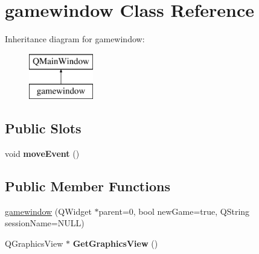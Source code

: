 \hypertarget{classgamewindow}{\section{gamewindow Class Reference}
\label{classgamewindow}
}
Inheritance diagram for gamewindow\-:\begin{figure}[H]
\begin{center}
\leavevmode
\includegraphics[height=2.000000cm]{classgamewindow}
\end{center}
\end{figure}
\subsection*{Public Slots}
\begin{DoxyCompactItemize}
\item 
\hypertarget{classgamewindow_a69fdf6888c6496deedba54f588867415}{void {\bfseries move\-Event} ()}\label{classgamewindow_a69fdf6888c6496deedba54f588867415}

\end{DoxyCompactItemize}
\subsection*{Public Member Functions}
\begin{DoxyCompactItemize}
\item 
\hyperlink{classgamewindow_a3e131541b6a8c961d0156a62a02b7862}{gamewindow} (Q\-Widget $\ast$parent=0, bool new\-Game=true, Q\-String session\-Name=N\-U\-L\-L)
\item 
\hypertarget{classgamewindow_ac1f14593e7296da6c62db78f159e48c8}{Q\-Graphics\-View $\ast$ {\bfseries Get\-Graphics\-View} ()}\label{classgamewindow_ac1f14593e7296da6c62db78f159e48c8}

\end{DoxyCompactItemize}
